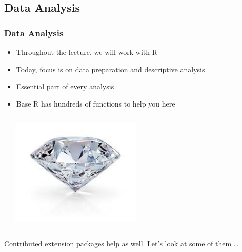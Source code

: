 \subsection{Data Analysis}

\begin{frame}
	\frametitle{Data Analysis}
	
	\begin{itemize}
		\item Throughout the lecture, we will work with R
		\item Today, focus is on \alert{data preparation} and \alert{descriptive analysis}
		\item Essential part of every analysis
		\item Base R has hundreds of functions to help you here
	\end{itemize}

	\begin{columns}
		\begin{example}
		\end{example}
		\includegraphics[width=0.95\textwidth]{pics/diamond.jpg}
	\end{columns}

	\begin{block}{Contributed extension packages help as well. Let's look at some of them \dots}
	\end{block}

\end{frame}

